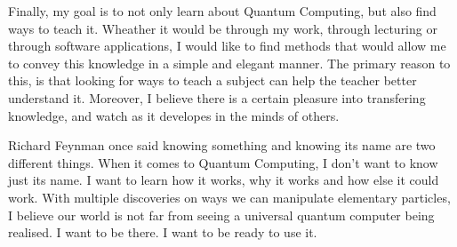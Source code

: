 \documentclass[a4paper,10pt]{article}
\begin{document}
Finally, my goal is to not only learn about Quantum Computing, but also find ways to teach it. Wheather it would be through my work, through lecturing
or through software applications, I would like to find methods that would allow me to convey this knowledge in a simple and elegant manner.
The primary reason to this, is that looking for ways to teach a subject can help the teacher better understand it. Moreover, I believe there is a certain
pleasure into transfering knowledge, and watch as it developes in the minds of others.

Richard Feynman once said knowing something and knowing its name are two different things.
When it comes to Quantum Computing, I don't want to know just its name. I want to learn how it works, why it works and how else it could work.
With multiple discoveries on ways we can manipulate elementary particles, I believe our world is not far from seeing a universal quantum computer being realised.
I want to be there. I want to be ready to use it.
\end{document}
